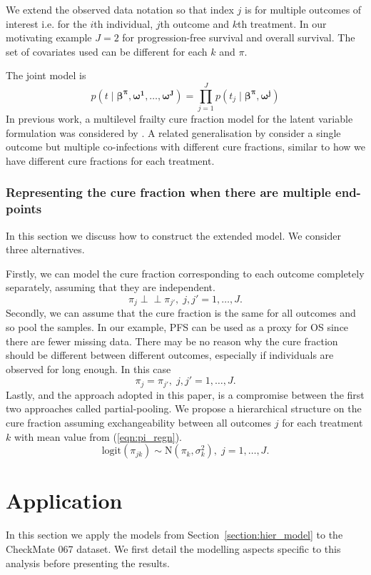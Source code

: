 \documentclass[AMA,STIX1COL]{WileyNJD-v2}
\begin{document}
We extend the observed data notation so that index $j$ is for multiple outcomes of interest
i.e. for the $i$th individual, $j$th outcome and $k$th treatment.
In our motivating example $J = 2$ for progression-free survival and overall survival.
The set of covariates used can be different for each $k$ and $\pi$.

The joint model is
$$
p(t \mid \boldsymbol{\beta^{\pi}}, \boldsymbol{\omega^1}, \ldots, \boldsymbol{\omega^J}) =
\prod_{j=1}^J p(t_j \mid \boldsymbol{\beta^{\pi}}, \boldsymbol{\omega^j})
$$
In previous work, a multilevel frailty cure fraction model for the latent variable formulation was considered by \cite{Tawiah2020}.
A related generalisation by \cite{Balogun2020} consider a single outcome but multiple co-infections with different cure fractions,
similar to how we have different cure fractions for each treatment.

%
\subsubsection{Representing the cure fraction when there are multiple end-points}
In this section we discuss how to construct the extended model.
We consider three alternatives.

Firstly, we can model the cure fraction corresponding to each outcome completely separately, assuming that they are independent.
$$
\pi_j \perp\!\!\!\perp \pi_{j'}, \; j,j' = 1, \ldots, J.
$$
Secondly, we can assume that the cure fraction is the same for all outcomes and so pool the samples.
In our example, PFS can be used as a proxy for OS since there are fewer missing data.
There may be no reason why the cure fraction should be different between different outcomes, especially if individuals are observed for long enough.
In this case
$$
\pi_j = \pi_{j'}, \; j,j' = 1, \ldots, J.
$$
Lastly, and the approach adopted in this paper, is a compromise between the first two approaches called partial-pooling.
We propose a hierarchical structure on the cure fraction assuming exchangeability between all outcomes $j$ for each treatment $k$ with mean value from (\ref{eqn:pi_regn}).
$$
\text{logit}(\pi_{jk}) \sim \text{N}(\pi_k, \sigma_k^2), \; j = 1, \ldots, J.  
$$

%
\section{Application}\label{sec:application}
In this section we apply the models from Section~\ref{section:hier_model} to the CheckMate 067 dataset.
We first detail the modelling aspects specific to this analysis before presenting the results.
\end{document}

